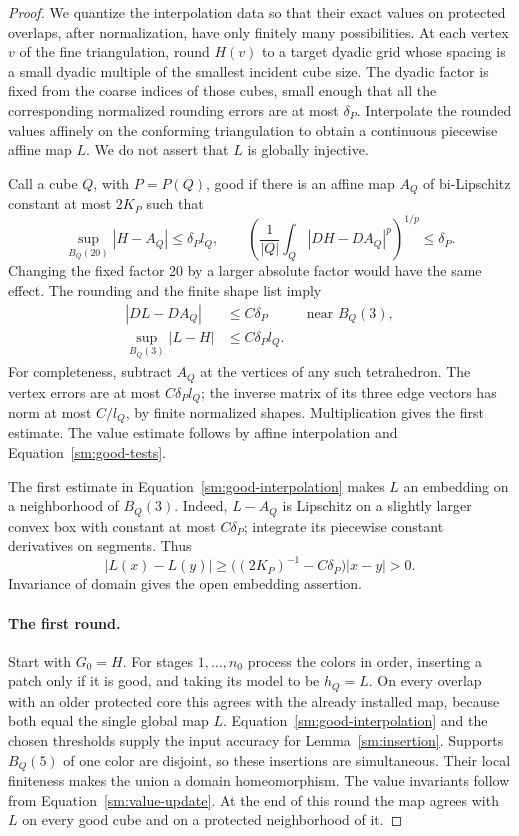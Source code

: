 \documentclass[11pt]{article}
\numberwithin{equation}{section}
\theoremstyle{definition}
\theoremstyle{remark}
\begin{document}
\begin{proof}
We quantize the interpolation data so that their exact values on
protected overlaps, after normalization, have only finitely many
possibilities.  At each vertex $v$ of the fine triangulation, round $H(v)$
to a target dyadic grid whose spacing is a small dyadic
multiple of the smallest incident cube size.  The dyadic
factor is fixed from the coarse indices of those cubes,
small enough that all the corresponding normalized
rounding errors are at most $\delta_P$.  Interpolate
the rounded values affinely on the conforming
triangulation to obtain a continuous piecewise affine
map $L$.  We do not assert that $L$ is globally injective.

Call a cube $Q$, with $P=P(Q)$, good if there is an affine
map $A_Q$ of bi-Lipschitz constant at most $2K_P$ such that
\begin{equation}
 \label{sm:good-tests}
 \sup_{B_Q(20)}|H-A_Q|\le\delta_P l_Q,
 \qquad
 \left(\frac{1}{|Q|}\int_Q|DH-DA_Q|^p\right)^{1/p}\le\delta_P.
\end{equation}
Changing the fixed factor 20 by a larger absolute factor
would have the same effect.  The rounding and the finite
shape list imply
\begin{equation}
 \label{sm:good-interpolation}
 \begin{aligned}
 |DL-DA_Q|&\le C\delta_P
 &&\text{near }B_Q(3),\\
 \sup_{B_Q(3)}|L-H|&\le C\delta_P l_Q.
 \end{aligned}
\end{equation}
For completeness, subtract $A_Q$ at the vertices of any
such tetrahedron.  The vertex errors are at most
$C\delta_P l_Q$; the inverse matrix of its three edge
vectors has norm at most $C/l_Q$, by finite normalized
shapes.  Multiplication gives the first estimate.
The value estimate follows by affine interpolation
and Equation~\eqref{sm:good-tests}.

The first estimate in Equation~\eqref{sm:good-interpolation} makes
$L$ an embedding on a neighborhood of $B_Q(3)$.
Indeed, $L-A_Q$ is Lipschitz on a slightly larger convex
box with constant at most $C\delta_P$; integrate its
piecewise constant derivatives on segments.  Thus
\[
 |L(x)-L(y)|\ge
 \bigl((2K_P)^{-1}-C\delta_P\bigr)|x-y|>0.
\]
Invariance of domain gives the open embedding assertion.

\paragraph{The first round.}
Start with $G_0=H$.  For stages $1,\ldots,n_0$ process the
colors in order, inserting a patch only if it is good,
and taking its model to be $h_Q=L$.  On every overlap
with an older protected core this agrees with the
already installed map, because both equal the single
global map $L$.  Equation~\eqref{sm:good-interpolation}
and the chosen thresholds supply the input accuracy
for Lemma~\ref{sm:insertion}.  Supports $B_Q(5)$ of one
color are disjoint, so these insertions are simultaneous.
Their local finiteness makes the union a domain
homeomorphism.  The value invariants follow from
Equation~\eqref{sm:value-update}.  At the end of this round the
map agrees with $L$ on every good cube and on a
protected neighborhood of it.


\end{proof}
\end{document}
